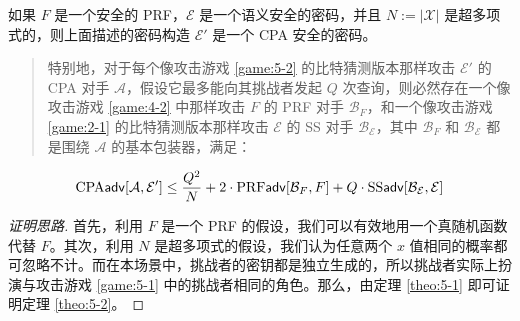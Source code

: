\begin{theorem}\label{theo:5-2}
如果 $F$ 是一个安全的 PRF，$\mathcal{E}$ 是一个语义安全的密码，并且 $N:=|\mathcal{X}|$ 是超多项式的，则上面描述的密码构造 $\mathcal{E}'$ 是一个 CPA 安全的密码。
\begin{quote}
特别地，对于每个像攻击游戏 \ref{game:5-2} 的比特猜测版本那样攻击 $\mathcal{E}'$ 的 CPA 对手 $\mathcal{A}$，假设它最多能向其挑战者发起 $Q$ 次查询，则必然存在一个像攻击游戏 \ref{game:4-2} 中那样攻击 $F$ 的 PRF 对手 $\mathcal{B}_F$，和一个像攻击游戏 \ref{game:2-1} 的比特猜测版本那样攻击 $\mathcal{E}$ 的 SS 对手 $\mathcal{B}_\mathcal{E}$，其中 $\mathcal{B}_F$ 和 $\mathcal{B}_\mathcal{E}$ 都是围绕 $\mathcal{A}$ 的基本包装器，满足：
\end{quote}
\begin{equation}\label{eq:5-5}
{\rm CPA}\mathsf{adv}[\mathcal{A},\mathcal{E}']\leq
\frac{Q^2}{N}+2\cdot{\rm PRF}\mathsf{adv}[\mathcal{B}_F,F]+Q\cdot{\rm SS}\mathsf{adv}[\mathcal{B}_\mathcal{E},\mathcal{E}]
\end{equation}
\end{theorem}

\begin{proof}[证明思路]
首先，利用 $F$ 是一个 PRF 的假设，我们可以有效地用一个真随机函数代替 $F$。其次，利用 $N$ 是超多项式的假设，我们认为任意两个 $x$ 值相同的概率都可忽略不计。而在本场景中，挑战者的密钥都是独立生成的，所以挑战者实际上扮演与攻击游戏 \ref{game:5-1} 中的挑战者相同的角色。那么，由定理 \ref{theo:5-1} 即可证明定理 \ref{theo:5-2}。
\end{proof}


